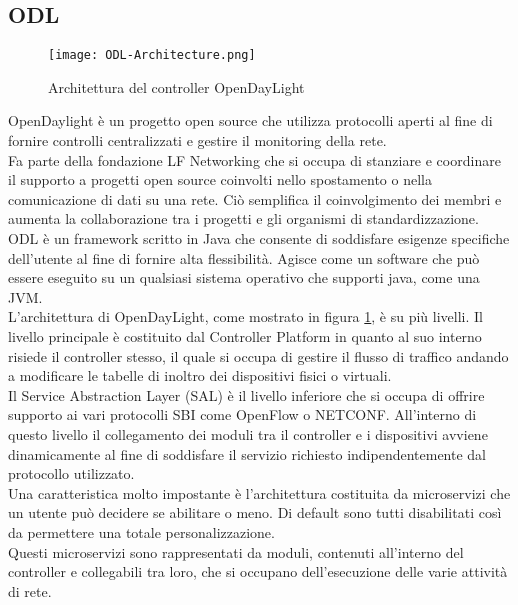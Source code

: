 \subsection{ODL}
\begin{figure}[h]
    \centering
   \texttt{[image: ODL-Architecture.png]}
    \caption{Architettura del controller OpenDayLight}
    \label{fig:ArchODL}
\end{figure}
OpenDaylight\cite{ODL} è un progetto open source che utilizza protocolli aperti al fine di fornire controlli centralizzati e gestire il monitoring della rete.
\\Fa parte della fondazione LF Networking \cite{LFN} che si occupa di stanziare e coordinare il supporto a progetti open source coinvolti nello spostamento o nella comunicazione di dati su una rete.
Ciò semplifica il coinvolgimento dei membri e aumenta la collaborazione tra i progetti e gli organismi di standardizzazione.
\\ODL è un framework scritto in Java che consente di soddisfare esigenze specifiche dell'utente al fine di fornire alta flessibilità. Agisce come un software che può essere eseguito su un qualsiasi sistema operativo che supporti java, come una JVM.
\\L'architettura di OpenDayLight, come mostrato in figura \ref{fig:ArchODL}, è su più livelli. 
Il livello principale è costituito dal Controller Platform in quanto al suo interno risiede il controller stesso, il quale si 
occupa di gestire il flusso di traffico andando a modificare le tabelle di inoltro dei dispositivi fisici o virtuali. 
\\Il Service Abstraction Layer (SAL) è il livello inferiore che si occupa di offrire supporto ai vari protocolli SBI come OpenFlow o NETCONF. 
All'interno di questo livello il collegamento dei moduli tra il controller e i dispositivi avviene dinamicamente al fine di soddisfare il servizio richiesto indipendentemente dal protocollo utilizzato.
\\Una caratteristica molto impostante è l'architettura costituita da microservizi che un utente può decidere se abilitare o meno. 
Di default sono tutti disabilitati così da permettere una totale personalizzazione.
\\Questi microservizi sono rappresentati da moduli, contenuti all'interno del controller e collegabili tra loro, che si occupano dell'esecuzione delle varie attività di rete.
